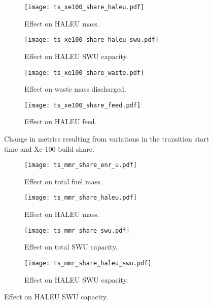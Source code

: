 \begin{figure}
    \begin{subfigure}[b]{0.48\textwidth}
        \centering
        \texttt{[image: ts\_xe100\_share\_haleu.pdf]}
        \caption{Effect on HALEU mass.}
        \label{fig:ts_xe100_share_haleu}
    \end{subfigure}
    \begin{subfigure}[b]{0.48\textwidth}
        \centering
        \texttt{[image: ts\_xe100\_share\_haleu\_swu.pdf]}
        \caption{Effect on HALEU SWU capacity.}
        \label{fig:ts_xe100_share_haleu_swu}
    \end{subfigure}
    
    \begin{subfigure}[b]{0.48\textwidth}
        \centering
        \texttt{[image: ts\_xe100\_share\_waste.pdf]}
        \caption{Effect on waste mass discharged.}
        \label{fig:ts_xe100_share_waste}
    \end{subfigure}
    \hfill
    \begin{subfigure}[b]{0.48\textwidth}
        \centering
        \texttt{[image: ts\_xe100\_share\_feed.pdf]}
        \caption{Effect on HALEU feed.}
        \label{fig:ts_xe100_share_feed}
    \end{subfigure}
    \caption{Change in metrics resulting from variations in the 
    transition start time and Xe-100 build share.}
    \label{fig:ts_xe100_share}
\end{figure}

\begin{figure}
    \begin{subfigure}[b]{0.48\textwidth}
        \centering
        \texttt{[image: ts\_mmr\_share\_enr\_u.pdf]}
        \caption{Effect on total fuel mass.}
        \label{fig:ts_mmr_share_enr_u}
    \end{subfigure}
    \hfill
    \begin{subfigure}[b]{0.48\textwidth}
        \centering
        \texttt{[image: ts\_mmr\_share\_haleu.pdf]}
        \caption{Effect on HALEU mass.}
        \label{fig:ts_mmr_share_haleu}
    \end{subfigure}
    
    \begin{subfigure}[b]{0.48\textwidth}
        \centering
        \texttt{[image: ts\_mmr\_share\_swu.pdf]}
        \caption{Effect on total SWU capacity.}
        \label{fig:ts_mmr_share_swu}
    \end{subfigure}
    \hfill
    \begin{subfigure}[b]{0.48\textwidth}
        \centering
        \texttt{[image: ts\_mmr\_share\_haleu\_swu.pdf]}
        \caption{Effect on HALEU SWU capacity.}
        \label{fig:ts_mmr_share_haleu_swu}
    \end{subfigure}
\end{figure}

